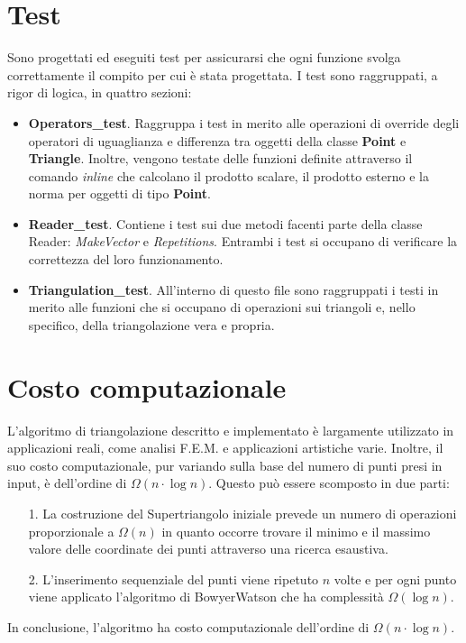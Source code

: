 \documentclass{article}
\begin{document}
\section{Test}
Sono progettati ed eseguiti test per assicurarsi che ogni funzione svolga correttamente il compito per cui è stata progettata.  I test sono raggruppati,  a rigor di logica,  in quattro sezioni:
\begin{itemize}
	\item \textbf{Operators\_test}.  Raggruppa i test in merito alle operazioni di override degli operatori di uguaglianza e differenza tra oggetti della classe \textbf{Point} e \textbf{Triangle}.  Inoltre,  vengono testate delle funzioni definite attraverso il comando \emph{inline} che calcolano il prodotto scalare,  il prodotto esterno e la norma per oggetti di tipo \textbf{Point}.  
	\item \textbf{Reader\_test}.  Contiene i test sui due metodi facenti parte della classe Reader: \emph{MakeVector} e \emph{Repetitions}. Entrambi i test si occupano di verificare la correttezza del loro funzionamento.
	\item \textbf{Triangulation\_test}.  All'interno di questo file sono raggruppati i testi in merito alle funzioni che si occupano di operazioni sui triangoli e,   nello specifico,  della triangolazione vera e propria.
\end{itemize}

\section{Costo computazionale}
L'algoritmo di triangolazione descritto e implementato è largamente utilizzato in applicazioni reali,  come analisi F.E.M.  e applicazioni artistiche varie.  Inoltre,  il suo costo computazionale,  pur variando sulla base del numero di punti presi in input,  è dell'ordine di $\Omega(n\cdot \log n)$.  Questo può essere scomposto in due parti:

\begin{itemize}
	\item[1.] La costruzione del Supertriangolo iniziale prevede un numero di operazioni proporzionale a $\Omega(n)$ in quanto occorre trovare il minimo e il massimo valore delle coordinate dei punti attraverso una ricerca esaustiva.
	\item[2.] L'inserimento sequenziale del punti viene ripetuto $n$ volte e per ogni punto viene applicato  l'algoritmo di Bowyer\-Watson che ha complessità $\Omega( \log n)$.
\end{itemize}
In conclusione,  l'algoritmo ha costo computazionale dell'ordine di $\Omega(n\cdot \log n)$.
\end{document}
